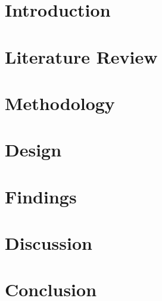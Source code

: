 
\chapter{Introduction}


\chapter{Literature Review}

\vspace{1em}

\chapter{Methodology}

\vspace{1em}

\chapter{Design}

\vspace{1em}

\chapter{Findings}

\vspace{1em}

\chapter{Discussion}


\vspace{1em}

\chapter{Conclusion}


\vspace{1em}
